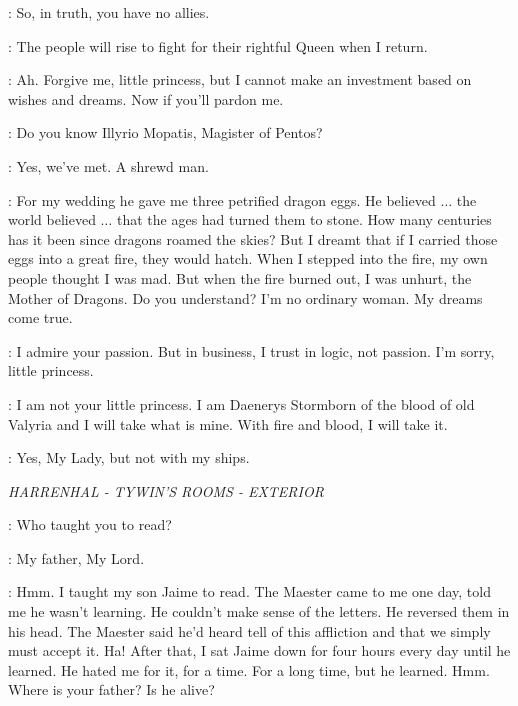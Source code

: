 \SPICEKING: So, in truth, you have no allies. 

\DAENERYS: The people will rise to fight for their rightful Queen when I return. 

\SPICEKING: Ah. Forgive me, little princess, but I cannot make an investment based on wishes and dreams. Now if you'll pardon me. 

\DAENERYS: Do you know Illyrio Mopatis, Magister of Pentos? 

\SPICEKING: Yes, we've met. A shrewd man. 

\DAENERYS: For my wedding he gave me three petrified dragon eggs. He believed $\ldots$ the world believed $\ldots$ that the ages had turned them to stone. How many centuries has it been since dragons roamed the skies? But I dreamt that if I carried those eggs into a great fire, they would hatch. When I stepped into the fire, my own people thought I was mad. But when the fire burned out, I was unhurt, the Mother of Dragons. Do you understand? I'm no ordinary woman. My dreams come true. 

\SPICEKING: I admire your passion. But in business, I trust in logic, not passion. I'm sorry, little princess. 

\DAENERYS: I am not your little princess. I am Daenerys Stormborn of the blood of old Valyria and I will take what is mine. With fire and blood, I will take it. 

\SPICEKING:  Yes, My Lady, but not with my ships. 


\scene

\textit{HARRENHAL - TYWIN'S ROOMS - EXTERIOR} 


\TYWIN: Who taught you to read? 

\ARYA: My father, My Lord. 

\TYWIN: Hmm. I taught my son Jaime to read. The Maester came to me one day, told me he wasn't learning. He couldn't make sense of the letters. He reversed them in his head. The Maester said he'd heard tell of this affliction and that we simply must accept it. Ha! After that, I sat Jaime down for four hours every day until he learned. He hated me for it, for a time. For a long time, but he learned. Hmm.  Where is your father? Is he alive? 


